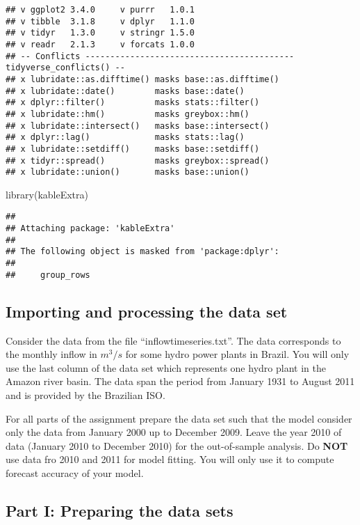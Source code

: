 \documentclass[
]{article}
\newenvironment{Shaded}{\begin{snugshade}}{\end{snugshade}}
\newcommand{\FunctionTok}[1]{\textcolor[rgb]{0.00,0.00,0.00}{#1}}
\newcommand{\NormalTok}[1]{#1}
\begin{document}
\begin{verbatim}
## v ggplot2 3.4.0     v purrr   1.0.1
## v tibble  3.1.8     v dplyr   1.1.0
## v tidyr   1.3.0     v stringr 1.5.0
## v readr   2.1.3     v forcats 1.0.0
## -- Conflicts ------------------------------------------ tidyverse_conflicts() --
## x lubridate::as.difftime() masks base::as.difftime()
## x lubridate::date()        masks base::date()
## x dplyr::filter()          masks stats::filter()
## x lubridate::hm()          masks greybox::hm()
## x lubridate::intersect()   masks base::intersect()
## x dplyr::lag()             masks stats::lag()
## x lubridate::setdiff()     masks base::setdiff()
## x tidyr::spread()          masks greybox::spread()
## x lubridate::union()       masks base::union()
\end{verbatim}

\begin{Shaded}
\begin{Highlighting}[]
\FunctionTok{library}\NormalTok{(kableExtra)}
\end{Highlighting}
\end{Shaded}

\begin{verbatim}
## 
## Attaching package: 'kableExtra'
## 
## The following object is masked from 'package:dplyr':
## 
##     group_rows
\end{verbatim}

\hypertarget{importing-and-processing-the-data-set}{%
\subsection{Importing and processing the data
set}\label{importing-and-processing-the-data-set}}

Consider the data from the file ``inflowtimeseries.txt''. The data
corresponds to the monthly inflow in \(m^{3}/s\) for some hydro power
plants in Brazil. You will only use the last column of the data set
which represents one hydro plant in the Amazon river basin. The data
span the period from January 1931 to August 2011 and is provided by the
Brazilian ISO.

For all parts of the assignment prepare the data set such that the model
consider only the data from January 2000 up to December 2009. Leave the
year 2010 of data (January 2010 to December 2010) for the out-of-sample
analysis. Do \textbf{NOT} use data fro 2010 and 2011 for model fitting.
You will only use it to compute forecast accuracy of your model.

\hypertarget{part-i-preparing-the-data-sets}{%
\subsection{Part I: Preparing the data
sets}\label{part-i-preparing-the-data-sets}}
\end{document}
